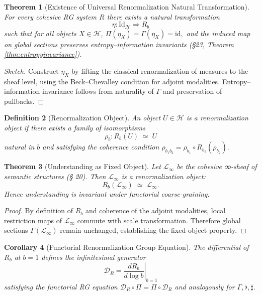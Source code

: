 \documentclass[12pt,a4paper,twoside,openright]{book}
\newtheorem{theorem}{Theorem}
\newtheorem{definition}[theorem]{Definition}
\newtheorem{corollary}[theorem]{Corollary}
\begin{document}
\begin{theorem}[Existence of Universal Renormalization Natural Transformation]
\label{thm:universalRG}
For every cohesive RG system \(R\) there exists a natural transformation
\[
\eta:\mathrm{Id}_\mathcal{H}\Rightarrow R_b
\]
such that for all objects \(X\in\mathcal{H}\),
\(
\Pi(\eta_X)=\Gamma(\eta_X)=\mathrm{id},
\)
and the induced map on global sections preserves entropy–information invariants (\S 23, Theorem \ref{thm:entropyinvariance}).
\end{theorem}

\begin{proof}[Sketch]
Construct $\eta_X$ by lifting the classical renormalization of measures to the sheaf level,
using the Beck–Chevalley condition for adjoint modalities.  
Entropy–information invariance follows from naturality of $\Gamma$ and preservation of pullbacks.
\end{proof}

\begin{definition}[Renormalization Object]
An object \(U\in\mathcal{H}\) is a \emph{renormalization object} if there exists a family of isomorphisms
\[
\rho_b: R_b(U)\;\simeq\;U
\]
natural in \(b\) and satisfying the coherence condition
\(
\rho_{b_1b_2}
 = \rho_{b_1}\circ R_{b_1}(\rho_{b_2}).
\)
\end{definition}

\begin{theorem}[Understanding as Fixed Object]
\label{thm:understandingfixed}
Let \(\mathcal{L}_\infty\) be the cohesive ∞-sheaf of semantic structures (§ 20).  
Then \(\mathcal{L}_\infty\) is a renormalization object:
\[
R_b(\mathcal{L}_\infty)\;\simeq\;\mathcal{L}_\infty.
\]
Hence understanding is invariant under functorial coarse-graining.
\end{theorem}

\begin{proof}
By definition of $R_b$ and coherence of the adjoint modalities,  
local restriction maps of $\mathcal{L}_\infty$ commute with scale transformation.
Therefore global sections $\Gamma(\mathcal{L}_\infty)$ remain unchanged,
establishing the fixed-object property.
\end{proof}

\begin{corollary}[Functorial Renormalization Group Equation]
The differential of \(R_b\) at \(b=1\) defines the infinitesimal generator
\[
\mathcal{D}_R
 = \left.\frac{dR_b}{d\log b}\right|_{b=1}
\]
satisfying the functorial RG equation
\(
\mathcal{D}_R \circ \Pi = \Pi\circ\mathcal{D}_R
\)
and analogously for \(\Gamma,\flat,\sharp\).
\end{corollary}
\end{document}
